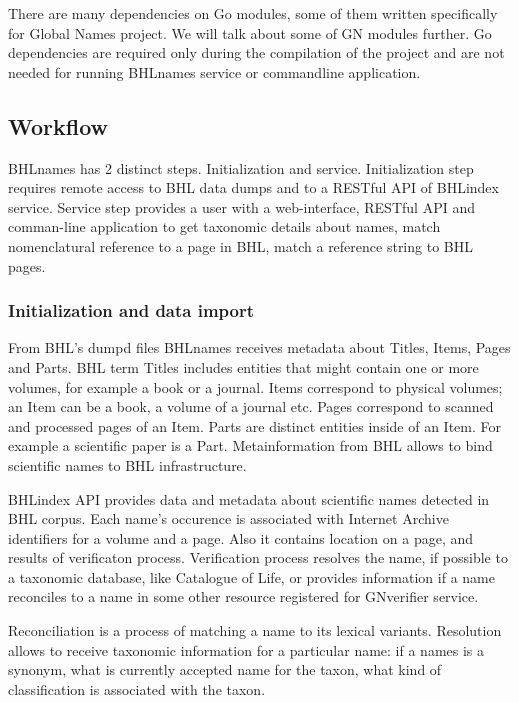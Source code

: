\documentclass[
]{article}
\begin{document}
There are many dependencies on Go modules, some of them written
specifically for Global Names project. We will talk about some of GN
modules further. Go dependencies are required only during the
compilation of the project and are not needed for running BHLnames
service or commandline application.

\hypertarget{workflow}{%
\subsection{Workflow}\label{workflow}}

BHLnames has 2 distinct steps. Initialization and service.
Initialization step requires remote access to BHL data dumps and to a
RESTful API of BHLindex service. Service step provides a user with a
web-interface, RESTful API and comman-line application to get taxonomic
details about names, match nomenclatural reference to a page in BHL,
match a reference string to BHL pages.

\hypertarget{initialization-and-data-import}{%
\subsubsection{Initialization and data
import}\label{initialization-and-data-import}}

From BHL's dumpd files BHLnames receives metadata about Titles, Items,
Pages and Parts. BHL term Titles includes entities that might contain
one or more volumes, for example a book or a journal. Items correspond
to physical volumes; an Item can be a book, a volume of a journal etc.
Pages correspond to scanned and processed pages of an Item. Parts are
distinct entities inside of an Item. For example a scientific paper is a
Part. Metainformation from BHL allows to bind scientific names to BHL
infrastructure.

BHLindex API provides data and metadata about scientific names detected
in BHL corpus. Each name's occurence is associated with Internet Archive
identifiers for a volume and a page. Also it contains location on a
page, and results of verificaton process. Verification process resolves
the name, if possible to a taxonomic database, like Catalogue of Life,
or provides information if a name reconciles to a name in some other
resource registered for GNverifier service.

Reconciliation is a process of matching a name to its lexical variants.
Resolution allows to receive taxonomic information for a particular
name: if a names is a synonym, what is currently accepted name for the
taxon, what kind of classification is associated with the taxon.
\end{document}
